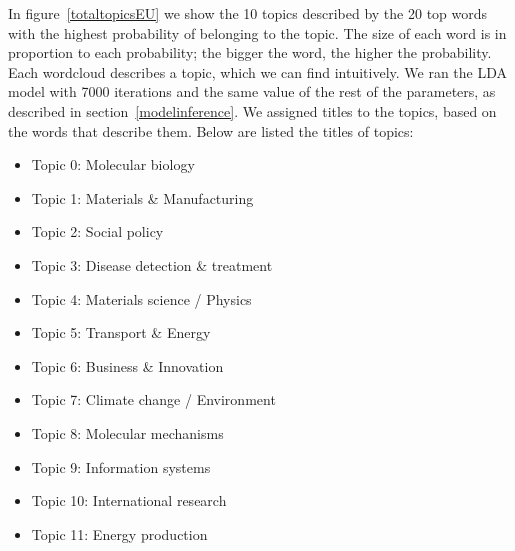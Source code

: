 \documentclass[12pt]{report}
\begin{document}
In figure~\ref{totaltopicsEU} we show the 10 topics described by
the 20 top words with the highest probability of belonging
to the topic. The size of each word is in proportion to each
probability; the bigger the word, the higher the probability. Each
wordcloud describes a topic, which we can find intuitively. 
We ran the LDA model with 7000
iterations and the same value of the rest of the
parameters, as described in section~\ref{modelinference}. We assigned titles 
to the topics, based on the words that describe them. Below are
listed the titles of topics:
\begin{itemize}
\item[] Topic 0: Molecular biology
\item[] Topic 1: Materials \& Manufacturing
\item[] Topic 2: Social policy
\item[] Topic 3: Disease detection \& treatment
\item[] Topic 4: Materials science / Physics
\item[] Topic 5: Transport \& Energy
\item[] Topic 6: Business \& Innovation
\item[] Topic 7: Climate change / Environment
\item[] Topic 8: Molecular mechanisms
\item[] Topic 9: Information systems
\item[] Topic 10: International research
\item[] Topic 11: Energy production
\end{itemize}
\end{document}
